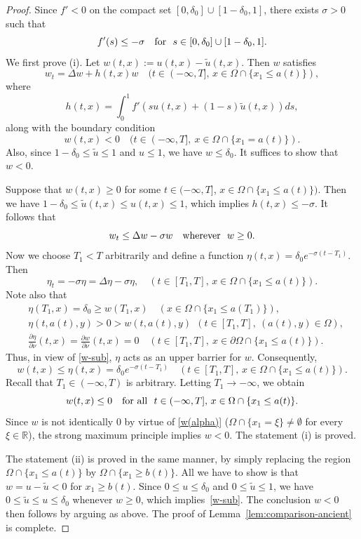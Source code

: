 \documentclass[a4paper,12pt,fullpage]{article}
\numberwithin{equation}{section}
\def\R{{\mathbb R}}
\begin{document}
\begin{proof}
Since $f'<0$ on the compact set $[0,\delta_0]\cup[1-\delta_0,1]$, there exists  $\sigma>0$ such that
\[
f'(s)\leq -\sigma \quad \hbox{for} \ \ s\in[0,\delta_0]\cup[1-\delta_0,1]. 
\]
We first prove (i). Let $w(t,x):=u(t,x)-\widetilde{u}(t,x)$.  Then $w$ satisfies
\[
w_t=\Delta w+h(t,x)w \quad (t\in (-\infty,T],\, x\in \Omega\cap\{x_1\leq  a(t)\}),
\]
where
\[
h(t,x)=\int_0^1 f'\left(su(t,x)+(1-s) \widetilde{u}(t,x)\right) ds,
\]
along with the boundary condition
\begin{equation}\label{w(alpha)}
w(t, x)<0\quad (t\in(-\infty,T],\ x\in \Omega\cap\{x_1= a(t)\}).
\end{equation}
Also, since $1-\delta_0\leq \widetilde u\leq 1$ and $u\leq 1$, we have $w\leq \delta_0$. 
It suffices to show that $w<0$.

Suppose that $w(t,x)\geq 0$ for some $t\in(-\infty,T]$, $x\in \Omega\cap\{x_1\leq  a(t)\})$. Then we have $1-\delta_0\leq \widetilde{u}(t,x)\leq u(t,x)\leq 1$, which implies $h(t,x)\leq -\sigma$.  It follows that
\begin{equation}\label{w-sub}
w_t\leq\Delta w -\sigma w \quad \hbox{wherever}\ \ w\geq 0.
\end{equation}
Now we choose $T_1<T$ arbitrarily and define a function $\eta(t,x)=\delta_0 e^{-\sigma(t-T_1)}$. Then
\[
\eta_t=-\sigma \eta=\Delta\eta -\sigma \eta,\quad (t\in [T_1,T],\, x\in \Omega\cap\{x_1\leq  a(t)\}).
\]
Note also that
\[
\begin{split}
& \eta(T_1,x)=\delta_0 \geq w(T_1,x)\quad  (x\in \Omega\cap\{x_1\leq a(T_1)\}),\\
& \eta(t, a(t),y)>0>w(t, a(t),y)\ \ (t\in[T_1,T],\ (a(t),y)\in\Omega),\\
& \frac{\partial\eta}{\partial\nu}(t,x)=\frac{\partial w}{\partial\nu}(t,x)=0\quad (t\in[T_1,T],\ x\in\partial\Omega\cap\{x_1\le a(t)\}).
\end{split}
\]
Thus, in view of \eqref{w-sub}, $\eta$ acts as an upper barrier for $w$. Consequently,
\[
w(t,x)\leq \eta(t,x)=\delta_0 e^{-\sigma(t-T_1)}\quad (t\in [T_1,T],\, x\in \Omega\cap\{x_1\leq  a(t)\}).
\]
Recall that $T_1\in (-\infty,T)$ is arbitrary. Letting $T_1\to -\infty$, we obtain
\[
w(t,x)\leq 0 \quad \hbox{for all}\ \ t\in (-\infty,T],\, x\in \Omega\cap\{x_1\leq  a(t)\}.
\]
Since $w$ is not identically $0$ by virtue of \eqref{w(alpha)} ($\Omega\cap\{x_1=\xi\}\neq\emptyset$ for every $\xi\in\R$), the strong maximum principle implies $w<0$. The statement (i) is proved.

The statement (ii) is proved in the same manner, by simply replacing the region $\Omega\cap\{x_1\leq a(t)\}$ by $\Omega\cap\{x_1\geq  b(t)\}$. All we have to show is that $w=u-\widetilde{u}<0$ for $x_1\geq  b(t)$. Since $0\leq u\leq \delta_0$ and $0\leq \widetilde{u}\leq 1$, we have $0\leq \widetilde{u}\leq u\leq \delta_0$ whenever $w\geq 0$, which implies~\eqref{w-sub}. The conclusion $w<0$ then follows by arguing as above. The proof of Lemma~\ref{lem:comparison-ancient} is complete.
\end{proof}
\end{document}
